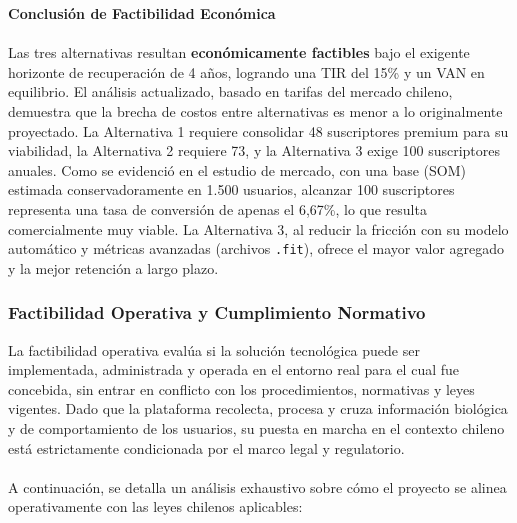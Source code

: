 \documentclass[12pt]{article}
\begin{document}
\textbf{Conclusión de Factibilidad Económica}
\\\\
Las tres alternativas resultan \textbf{económicamente factibles} bajo el exigente horizonte de recuperación de 4 años, logrando una TIR del 15\% y un VAN en equilibrio. El análisis actualizado, basado en tarifas del mercado chileno, demuestra que la brecha de costos entre alternativas es menor a lo originalmente proyectado. La Alternativa 1 requiere consolidar 48 suscriptores premium para su viabilidad, la Alternativa 2 requiere 73, y la Alternativa 3 exige 100 suscriptores anuales. Como se evidenció en el estudio de mercado, con una base (SOM) estimada conservadoramente en 1.500 usuarios, alcanzar 100 suscriptores representa una tasa de conversión de apenas el 6,67\%, lo que resulta comercialmente muy viable. La Alternativa 3, al reducir la fricción con su modelo automático y métricas avanzadas (archivos \texttt{.fit}), ofrece el mayor valor agregado y la mejor retención a largo plazo.
\newpage
\newpage
\subsubsection{Factibilidad Operativa y Cumplimiento Normativo}
La factibilidad operativa evalúa si la solución tecnológica puede ser implementada, administrada y operada en el entorno real para el cual fue concebida, sin entrar en conflicto con los procedimientos, normativas y leyes vigentes. Dado que la plataforma recolecta, procesa y cruza información biológica y de comportamiento de los usuarios, su puesta en marcha en el contexto chileno está estrictamente condicionada por el marco legal y regulatorio. 
\\\\
A continuación, se detalla un análisis exhaustivo sobre cómo el proyecto se alinea operativamente con las leyes chilenos aplicables:
\end{document}
